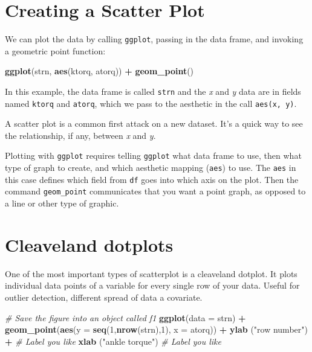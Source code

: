 \documentclass[
]{book}
\newenvironment{Shaded}{\begin{snugshade}}{\end{snugshade}}
\newcommand{\CommentTok}[1]{\textcolor[rgb]{0.56,0.35,0.01}{\textit{#1}}}
\newcommand{\DataTypeTok}[1]{\textcolor[rgb]{0.13,0.29,0.53}{#1}}
\newcommand{\DecValTok}[1]{\textcolor[rgb]{0.00,0.00,0.81}{#1}}
\newcommand{\KeywordTok}[1]{\textcolor[rgb]{0.13,0.29,0.53}{\textbf{#1}}}
\newcommand{\NormalTok}[1]{#1}
\newcommand{\OperatorTok}[1]{\textcolor[rgb]{0.81,0.36,0.00}{\textbf{#1}}}
\newcommand{\StringTok}[1]{\textcolor[rgb]{0.31,0.60,0.02}{#1}}
\begin{document}
\hypertarget{creating-a-scatter-plot}{%
\section{Creating a Scatter Plot}\label{creating-a-scatter-plot}}

We can plot the data by calling \texttt{ggplot}, passing in the data frame, and invoking a geometric point function:

\begin{Shaded}
\begin{Highlighting}[]
\KeywordTok{ggplot}\NormalTok{(strn, }\KeywordTok{aes}\NormalTok{(ktorq, atorq)) }\OperatorTok{+}
\StringTok{  }\KeywordTok{geom_point}\NormalTok{()}
\end{Highlighting}
\end{Shaded}

In this example, the data frame is called \texttt{strn} and the \emph{x} and \emph{y} data are in fields named \texttt{ktorq} and \texttt{atorq}, which we pass to the aesthetic in the call \texttt{aes(x,\ y)}.

A scatter plot is a common first attack on a new dataset. It's a quick
way to see the relationship, if any, between \emph{x} and \emph{y}.

Plotting with \texttt{ggplot} requires telling \texttt{ggplot} what data frame to use, then what type of graph to create, and which aesthetic mapping (\texttt{aes}) to use. The \texttt{aes} in this case defines which field from \texttt{df} goes into which axis on the plot. Then the command \texttt{geom\_point} communicates that you want a point graph, as opposed to a line or other type of graphic.

\hypertarget{cleaveland-dotplots}{%
\section{Cleaveland dotplots}\label{cleaveland-dotplots}}

One of the most important types of scatterplot is a cleaveland dotplot. It plots individual data points of a variable for every single row of your data. Useful for outlier detection, different spread of data a covariate.

\begin{Shaded}
\begin{Highlighting}[]
\CommentTok{# Save the figure into an object called f1}
\KeywordTok{ggplot}\NormalTok{(}\DataTypeTok{data =}\NormalTok{ strn) }\OperatorTok{+}\StringTok{ }
\StringTok{  }\KeywordTok{geom_point}\NormalTok{(}\KeywordTok{aes}\NormalTok{(}\DataTypeTok{y =} \KeywordTok{seq}\NormalTok{(}\DecValTok{1}\NormalTok{,}\KeywordTok{nrow}\NormalTok{(strn),}\DecValTok{1}\NormalTok{), }\DataTypeTok{x =}\NormalTok{ atorq)) }\OperatorTok{+}
\StringTok{  }\KeywordTok{ylab}\NormalTok{ (}\StringTok{"row number"}\NormalTok{) }\OperatorTok{+}\StringTok{ }\CommentTok{# Label you like}
\StringTok{  }\KeywordTok{xlab}\NormalTok{ (}\StringTok{"ankle torque"}\NormalTok{) }\CommentTok{# Label you like}
\end{Highlighting}
\end{Shaded}
\end{document}
